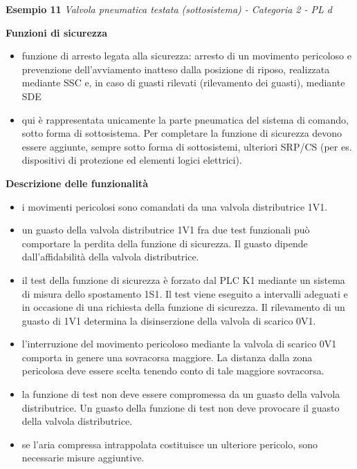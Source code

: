 \textbf{Esempio 11}
\textit{Valvola pneumatica testata (sottosistema) - Categoria 2 - PL d}

\begin{center}
    \begin{minipage}{\textwidth}
        \centering
        \captionsetup{hypcap=false}
        \resizebox{0.84\textwidth}{!}{}
        \label{fig:08-21}
    \end{minipage}
\end{center}

\textbf{Funzioni di sicurezza}
\begin{itemize}
    \item funzione di arresto legata alla sicurezza: arresto di un movimento pericoloso e prevenzione dell'avviamento inatteso dalla posizione di riposo, realizzata mediante SSC e, in caso di guasti rilevati (rilevamento dei guasti), mediante SDE
    \item qui è rappresentata unicamente la parte pneumatica del sistema di comando, sotto forma di sottosistema. Per completare la funzione di sicurezza devono essere aggiunte, sempre sotto forma di sottosistemi, ulteriori SRP/CS (per es. dispositivi di protezione ed elementi logici elettrici).
\end{itemize}

\textbf{Descrizione delle funzionalità}
\begin{itemize}
    \item i movimenti pericolosi sono comandati da una valvola distributrice 1V1.
    \item un guasto della valvola distributrice 1V1 fra due test funzionali può comportare la perdita della funzione di sicurezza. Il guasto dipende dall'affidabilità della valvola distributrice.
    \item il test della funzione di sicurezza è forzato dal PLC K1 mediante un sistema di misura dello spostamento 1S1. Il test viene eseguito a intervalli adeguati e in occasione di una richiesta della funzione di sicurezza. Il rilevamento di un guasto di 1V1 determina la disinserzione della valvola di scarico 0V1.
    \item l'interruzione del movimento pericoloso mediante la valvola di scarico 0V1 comporta in genere una sovracorsa maggiore. La distanza dalla zona pericolosa deve essere scelta tenendo conto di tale maggiore sovracorsa.
    \item la funzione di test non deve essere compromessa da un guasto della valvola distributrice. Un guasto della funzione di test non deve provocare il guasto della valvola distributrice.
    \item se l'aria compressa intrappolata costituisce un ulteriore pericolo, sono necessarie misure aggiuntive.
\end{itemize}

